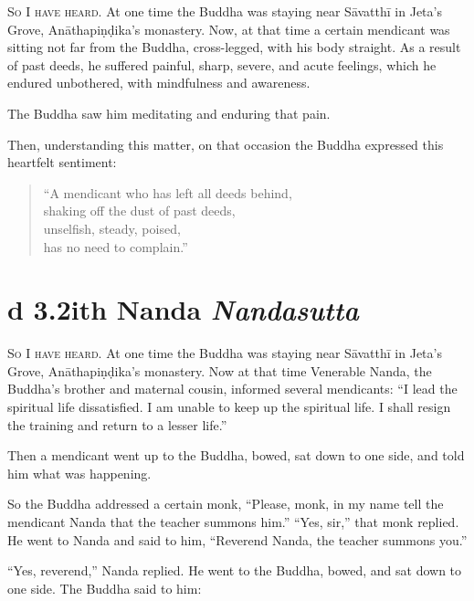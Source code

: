 \documentclass[12pt,openany]{book}%
\newcommand*{\suttatitleacronym}[1]{\smaller[2]{#1}\vspace*{.3em}}
\newcommand*{\suttatitletranslation}[1]{\linebreak{#1}}
\newcommand*{\suttatitleroot}[1]{\linebreak\smaller[2]\itshape{#1}}
\newcommand*{\tocacronym}[1]{\hspace*{-3.3em}{#1}\quad}
\newcommand*{\toctranslation}[1]{#1}
\newcommand*{\tocroot}[1]{(\textit{#1})}
\newcommand*{\scevam}[1]{\textsc{#1}}
\begin{document}
\scevam{So I have heard. }At one time the Buddha was staying near \textsanskrit{Sāvatthī} in Jeta’s Grove, \textsanskrit{Anāthapiṇḍika}’s monastery. Now, at that time a certain mendicant was sitting not far from the Buddha, cross-legged, with his body straight. As a result of past deeds, he suffered painful, sharp, severe, and acute feelings, which he endured unbothered, with mindfulness and awareness. 

The Buddha saw him meditating and enduring that pain. 

Then, understanding this matter, on that occasion the Buddha expressed this heartfelt sentiment: 

\begin{verse}%
“A mendicant who has left all deeds behind, \\
shaking off the dust of past deeds, \\
unselfish, steady, poised, \\
has no need to complain.” 

%
\end{verse}

%
\section*{{\suttatitleacronym Ud 3.2}{\suttatitletranslation With Nanda }{\suttatitleroot Nandasutta}}
\addcontentsline{toc}{section}{\tocacronym{Ud 3.2} \toctranslation{With Nanda } \tocroot{Nandasutta}}

\scevam{So I have heard. }At one time the Buddha was staying near \textsanskrit{Sāvatthī} in Jeta’s Grove, \textsanskrit{Anāthapiṇḍika}’s monastery. Now at that time Venerable Nanda, the Buddha’s brother and maternal cousin, informed several mendicants: “I lead the spiritual life dissatisfied. I am unable to keep up the spiritual life. I shall resign the training and return to a lesser life.” 

Then a mendicant went up to the Buddha, bowed, sat down to one side, and told him what was happening. 

So the Buddha addressed a certain monk, “Please, monk, in my name tell the mendicant Nanda that the teacher summons him.” “Yes, sir,” that monk replied. He went to Nanda and said to him, “Reverend Nanda, the teacher summons you.” 

“Yes, reverend,” Nanda replied. He went to the Buddha, bowed, and sat down to one side. The Buddha said to him: 
\end{document}
